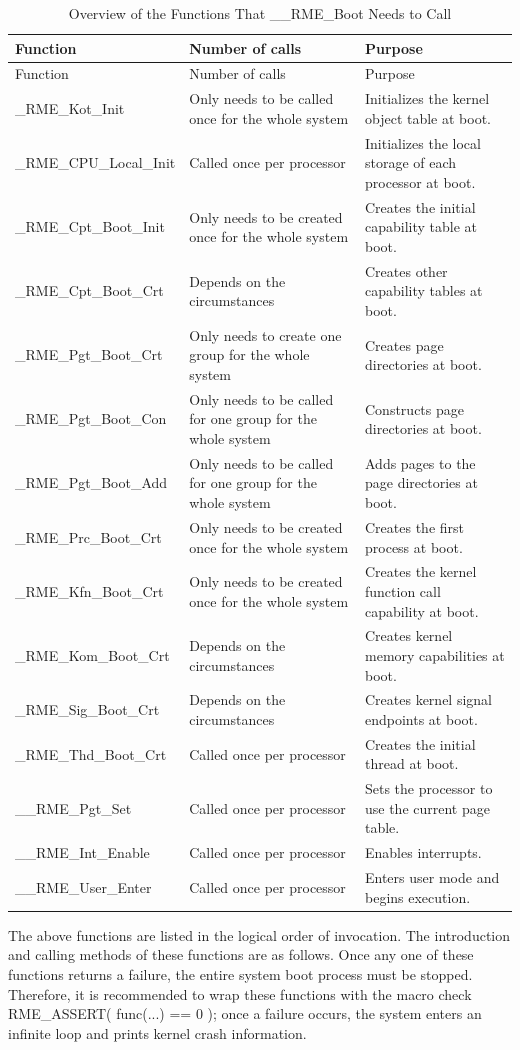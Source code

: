 \begin{xltabular}{\textwidth}{@{}>{\hsize\raggedright\arraybackslash}X>{\hsize\raggedright\arraybackslash}X>{\hsize\raggedright\arraybackslash}X@{}}
\caption{Overview of the Functions That \_\_RME\_Boot Needs to Call}\label{tab:7-37-rme-boot-called-functions-overview}\\
\toprule
Function & Number of calls & Purpose\tabularnewline
\endfirsthead
\toprule
Function & Number of calls & Purpose\tabularnewline
\midrule
\endhead
\bottomrule
\endlastfoot
\_RME\_Kot\_Init & Only needs to be called once for the whole system &
Initializes the kernel object table at boot.\tabularnewline
\_RME\_CPU\_Local\_Init & Called once per processor &
Initializes the local storage of each processor at boot.\tabularnewline
\_RME\_Cpt\_Boot\_Init & Only needs to be created once for the whole system &
Creates the initial capability table at boot.\tabularnewline
\_RME\_Cpt\_Boot\_Crt & Depends on the circumstances &
Creates other capability tables at boot.\tabularnewline
\_RME\_Pgt\_Boot\_Crt & Only needs to create one group for the whole system &
Creates page directories at boot.\tabularnewline
\_RME\_Pgt\_Boot\_Con & Only needs to be called for one group for the whole system &
Constructs page directories at boot.\tabularnewline
\_RME\_Pgt\_Boot\_Add & Only needs to be called for one group for the whole system &
Adds pages to the page directories at boot.\tabularnewline
\_RME\_Prc\_Boot\_Crt & Only needs to be created once for the whole system &
Creates the first process at boot.\tabularnewline
\_RME\_Kfn\_Boot\_Crt & Only needs to be created once for the whole system &
Creates the kernel function call capability at boot.\tabularnewline
\_RME\_Kom\_Boot\_Crt & Depends on the circumstances &
Creates kernel memory capabilities at boot.\tabularnewline
\_RME\_Sig\_Boot\_Crt & Depends on the circumstances &
Creates kernel signal endpoints at boot.\tabularnewline
\_RME\_Thd\_Boot\_Crt & Called once per processor &
Creates the initial thread at boot.\tabularnewline
\_\_RME\_Pgt\_Set & Called once per processor &
Sets the processor to use the current page table.\tabularnewline
\_\_RME\_Int\_Enable & Called once per processor & Enables interrupts.\tabularnewline
\_\_RME\_User\_Enter & Called once per processor &
Enters user mode and begins execution.\tabularnewline
\end{xltabular}
\nopagebreak[4]

The above functions are listed in the logical order of invocation. The introduction and calling methods of these functions are as follows. Once any one of these functions returns a failure, the entire system boot process must be stopped. Therefore, it is recommended to wrap these functions with the macro check RME\_ASSERT( func(...) == 0 ); once a failure occurs, the system enters an infinite loop and prints kernel crash information.

